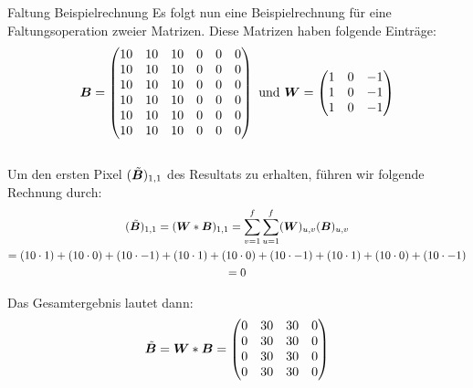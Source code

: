 \begin{examplebox}{Faltung Beispielrechnung}
  Es folgt nun eine Beispielrechnung für eine Faltungsoperation zweier Matrizen.
  Diese Matrizen haben folgende Einträge:
  \\
  \begin{equation*}
    \bm{B} =
    \begin{pmatrix}
      10 & 10 & 10 & 0 & 0 & 0 \\
      10 & 10 & 10 & 0 & 0 & 0 \\
      10 & 10 & 10 & 0 & 0 & 0 \\
      10 & 10 & 10 & 0 & 0 & 0 \\
      10 & 10 & 10 & 0 & 0 & 0 \\
      10 & 10 & 10 & 0 & 0 & 0 \\
    \end{pmatrix}
    \text{ und } \bm{W} =
    \begin{pmatrix}
      1 & 0 & -1 \\
      1 & 0 & -1 \\
      1 & 0 & -1 \\
    \end{pmatrix}
  \end{equation*}
  \\
  Um den ersten Pixel $(\tilde{\bm{B}})_{1,1}$ des Resultats zu erhalten, führen wir folgende Rechnung durch:
  \begin{gather*}
    (\tilde{\bm{B}})_{1,1} = (\bm{W} * \bm{B})_{1,1} = \sum_{v=1}^{f} \sum_{u=1}^{f} (\bm{W})_{u,v} (\bm{B})_{u,v} \\
                           = (10 \cdot 1) + (10 \cdot 0) + (10 \cdot -1) + (10 \cdot 1) + (10 \cdot 0) + (10 \cdot -1) + (10 \cdot 1) + (10 \cdot 0) + (10 \cdot -1) \\
                           = 0
  \end{gather*}

  Das Gesamtergebnis lautet dann:
  \begin{equation*}
    \tilde{\bm{B}} = \bm{W} * \bm{B} =
    \begin{pmatrix}
      0 & 30 & 30 & 0 \\
      0 & 30 & 30 & 0 \\
      0 & 30 & 30 & 0 \\
      0 & 30 & 30 & 0 \\
    \end{pmatrix}
  \end{equation*}
\end{examplebox}
